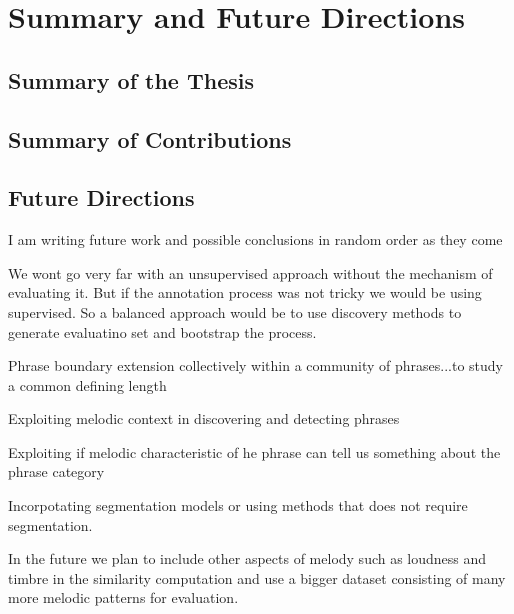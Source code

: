 
\chapter{Summary and Future Directions}
\label{sec:summary_future_work}

\section{Summary of the Thesis}
\section{Summary of Contributions}
\section{Future Directions}



I am writing future work and possible conclusions in random order as they come 

We wont go very far with an unsupervised approach without the mechanism of evaluating it. But if the annotation process was not tricky we would be using supervised. So a balanced approach would be to use discovery methods to generate evaluatino set and bootstrap the process. 

Phrase boundary extension collectively within a community of phrases...to study a common defining length

Exploiting melodic context in discovering and detecting phrases

Exploiting if melodic characteristic of he phrase can tell us something about the phrase category

Incorpotating segmentation models or using methods that does not require segmentation.

In the future we plan to include other aspects of melody such as loudness and timbre in the similarity computation and use a bigger dataset consisting of many more melodic patterns for evaluation.
